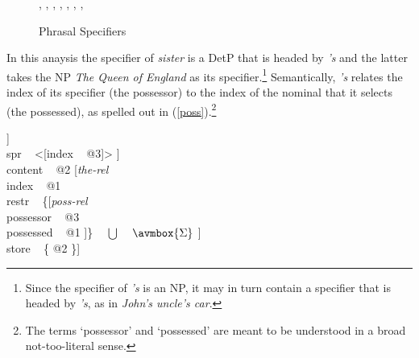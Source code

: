 \documentclass[output=paper]{langsci/langscibook}
\begin{document}
\begin{figure}  
\begin{center}
\footnotesize
\tree
  {,
    {,
      {,
        {}},
      {,
        {}}},
    {,
      {}}}
\caption{\label{cousin} Phrasal Specifiers } 
\normalsize
\end{center}
\end{figure}

In this anaysis the specifier of {\it sister\/} is a DetP that is headed by {\it 's\/} 
and the latter takes the NP {\it The Queen of England\/} as its specifier.\footnote{Since the 
specifier of {\it 's\/} is an NP, it may in turn contain a specifier that is headed 
by {\it 's}, as in {\it John's uncle's car}.}
Semantically, {\it 's\/} relates the index of its specifier (the possessor) to the index
of the nominal that it selects (the possessed), as spelled out in (\ref{poss}).\footnote{The
terms `possessor' and `possessed' are meant to be understood in a broad not-too-literal sense.}     

\begin{exe} 
\ex\label{poss}
\begin{avm}
[cat [head [{\it det\/}                       \\
            spec [{\it parameter\/}           \\
                  index ~ @1                  \\
                  restr ~ $\avmbox{\Sigma}$ ]] \\
      spr ~ <[index ~ @3]> ]                  \\
 content ~ @2 [{\it the-rel\/}                \\
               index ~ @1                     \\
               restr ~ \{[{\it poss-rel\/}    \\
                          possessor ~ @3      \\
                          possessed ~ @1 ]\} ~ $\bigcup$ ~ $\avmbox{\Sigma}$ ] \\
 store ~ \{ @2 \}]  
\end{avm}
\end{exe}
\end{document}
